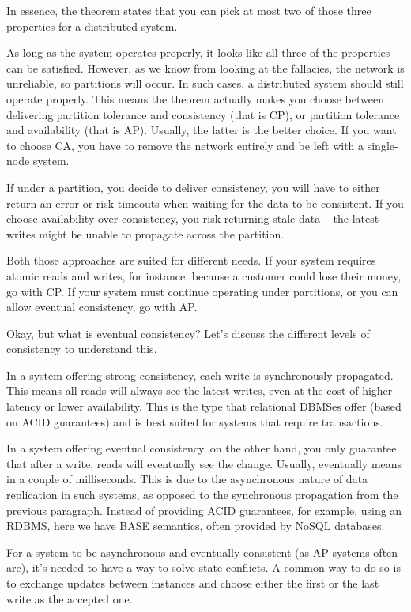 In essence, the theorem states that you can pick at most two of those three properties for a distributed system.

As long as the system operates properly, it looks like all three of the properties can be satisfied. However, as we know from looking at the fallacies, the network is unreliable, so partitions will occur. In such cases, a distributed system should still operate properly. This means the theorem actually makes you choose between delivering partition tolerance and consistency (that is CP), or partition tolerance and availability (that is AP). Usually, the latter is the better choice. If you want to choose CA, you have to remove the network entirely and be left with a single-node system.

If under a partition, you decide to deliver consistency, you will have to either return an error or risk timeouts when waiting for the data to be consistent. If you choose availability over consistency, you risk returning stale data – the latest writes might be unable to propagate across the partition.

Both those approaches are suited for different needs. If your system requires atomic reads and writes, for instance, because a customer could lose their money, go with CP. If your system must continue operating under partitions, or you can allow eventual consistency, go with AP.

Okay, but what is eventual consistency? Let's discuss the different levels of consistency to understand this.

In a system offering strong consistency, each write is synchronously propagated. This means all reads will always see the latest writes, even at the cost of higher latency or lower availability. This is the type that relational DBMSes offer (based on ACID guarantees) and is best suited for systems that require transactions. 

In a system offering eventual consistency, on the other hand, you only guarantee that after a write, reads will eventually see the change. Usually, eventually means in a couple of milliseconds. This is due to the asynchronous nature of data replication in such systems, as opposed to the synchronous propagation from the previous paragraph. Instead of providing ACID guarantees, for example, using an RDBMS, here we have BASE semantics, often provided by NoSQL databases.

For a system to be asynchronous and eventually consistent (as AP systems often are), it's needed to have a way to solve state conflicts. A common way to do so is to exchange updates between instances and choose either the first or the last write as the accepted one.

